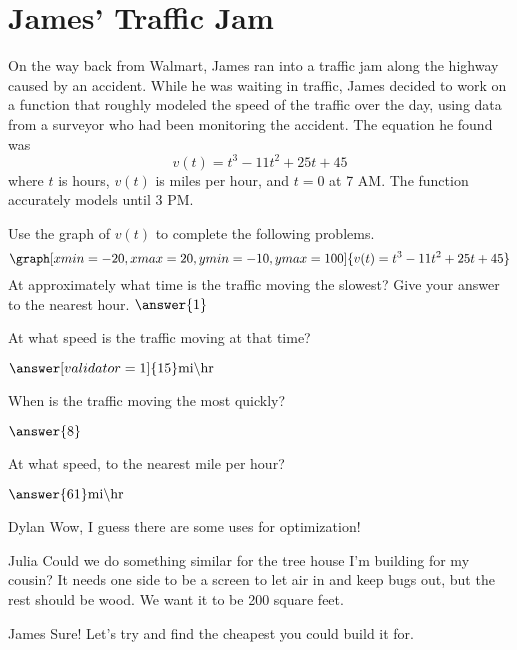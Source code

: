 \documentclass{ximera}
\begin{document}
\section{James' Traffic Jam}
On the way back from Walmart, James ran into a traffic jam along the highway caused by an accident. While he was waiting in traffic, James decided to work on a function that roughly modeled the speed of the traffic over the day, using data from a surveyor who had been monitoring the accident. The equation he found was $$v(t)=t^3-11t^2+25t+45$$ where $t$ is hours, $v(t)$ is miles per hour, and $t = 0$ at 7 AM. The function accurately models until 3 PM.
\begin{question}
Use the graph of $v(t)$ to complete the following problems.
\[
\graph[xmin=-20,xmax=20,ymin=-10,ymax=100]{v(t)=t^3-11t^2+25t+45}
\]
At approximately what time is the traffic moving the slowest? Give your answer to the nearest hour.
$\answer{1}$
\begin{multipleChoice}
\end{multipleChoice}

At what speed is the traffic moving at that time?

$\answer[validator=1]{15} \text{mi} \backslash \text{hr}$

When is the traffic moving the most quickly?

$\answer{8}$\begin{multipleChoice}
\end{multipleChoice}

At what speed, to the nearest mile per hour?

$\answer{61} \text{mi} \backslash \text{hr}$

\end{question}
\begin{dialogue}
\item[Dylan] Wow, I guess there are some uses for optimization!
\item[Julia] Could we do something similar for the tree house I'm building for my cousin? It needs one side to be a screen to let air in and keep bugs out, but the rest should be wood. We want it to be 200 square feet.
\item[James] Sure! Let's try and find the cheapest you could build it for.
\end{dialogue}
\end{document}
